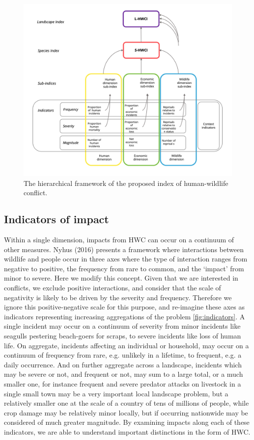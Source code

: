 \documentclass[fleqn,10pt]{olplainarticle}
\begin{document}
\begin{figure}
    \centering
    \includegraphics[width = 1\textwidth]{hwci_hierarchical_diagram_20221117.png}
    \caption{The hierarchical framework of the proposed index of human-wildlife conflict.}
    \label{fig:framework}
\end{figure}

\subsection*{Indicators of impact}
Within a single dimension, impacts from HWC can occur on a continuum of other measures. Nyhus (2016) presents a framework where interactions between wildlife and people occur in three axes where the type of interaction ranges from negative to positive, the frequency from rare to common, and the ‘impact’ from minor to severe. Here we modify this concept. Given that we are interested in conflicts, we exclude positive interactions, and consider that the scale of negativity is likely to be driven by the severity and frequency. Therefore we ignore this positive-negative scale for this purpose, and re-imagine these axes as indicators representing increasing aggregations of the problem \ref{fig:indicators}.
A single incident may occur on a continuum of severity from minor incidents like seagulls pestering beach-goers for scraps, to severe incidents like loss of human life. On aggregate, incidents affecting an individual or household, may occur on a continuum of frequency from rare, e.g. unlikely in a lifetime, to frequent, e.g. a daily occurrence. And on further aggregate across a landscape, incidents which may be severe or not, and frequent or not, may sum to a large total, or a much smaller one, for instance frequent and severe predator attacks on livestock in a single small town may be a very important local landscape problem, but a relatively smaller one at the scale of a country of tens of millions of people, while crop damage may be relatively minor locally, but if occurring nationwide may be considered of much greater magnitude.
By examining impacts along each of these indicators, we are able to understand important distinctions in the form of HWC. 
\end{document}
